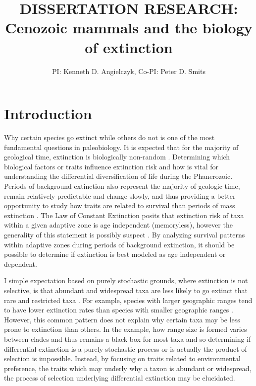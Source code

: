 \documentclass[11pt,letterpaper]{article}
\title{\uppercase{Dissertation Research:}\\ Cenozoic mammals and the biology of extinction}
\author{PI: Kenneth D. Angielczyk, Co-PI: Peter D. Smits}
\date{}
\begin{document}
\setcounter{secnumdepth}{0}
\maketitle
\section{Introduction}
Why certain species go extinct while others do not is one of the most fundamental questions in paleobiology. It is expected that for the majority of geological time, extinction is biologically non-random \citep{Jablonski1986,Alexander1977,Harnik2011,Johnson2002b,Kitchell1986,Nurnberg2013a,Payne2007}. Determining which biological factors or traits influence extinction risk and how is vital for understanding the differential diversification of life during the Phanerozoic. Periods of background extinction also represent the majority of geologic time, remain relatively predictable and change slowly, and thus providing a better opportunity to study how traits are related to survival than periods of mass extinction \citep{Jablonski1986,Raup1988}. The Law of Constant Extinction \citep{VanValen1973} posits that extinction risk of taxa within a given adaptive zone is age independent (memoryless), however the generality of this statement is possibly suspect \citep{Drake2014,Raup1975,Sepkoski1975,Finnegan2008}. By analyzing survival patterns within adaptive zones during periods of background extinction, it should be possible to determine if extinction is best modeled as age independent or dependent.

I simple expectation based on purely stochastic grounds, where extinction is not selective, is that abundant and widespread taxa are less likely to go extinct that rare and restricted taxa \citep{Raup1991b}. For example, species with larger geographic ranges tend to have lower extinction rates than species with smaller geographic ranges \citep{Jablonski1986,Harnik2013,Nurnberg2013a,Jablonski2003,Roy2009c}. However, this common pattern does not explain why certain taxa may be less prone to extinction than others. In the example, how range size is formed varies between clades and thus remains a black box for most taxa \citep{Jablonski1987} and so determining if differential extinction is a purely stochastic process or is actually the product of selection is impossible. Instead, by focusing on traits related to environmental preference, the traits which may underly why a taxon is abundant or widespread, the process of selection underlying differential extinction may be elucidated.
\end{document}
